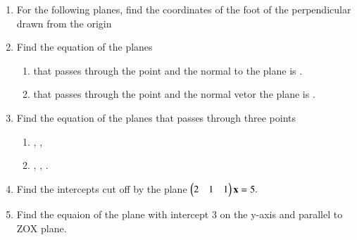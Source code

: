 \begin{enumerate}[label=\arabic*.,ref=\thesubsection.\theenumi]
%
\item  For the following planes, find the coordinates of the foot of the perpendicular drawn from the origin
\begin{enumerate}[itemsep=2pt]
\end{enumerate}
\item Find the equation of the planes
\begin{enumerate}
\item that passes through the point  and the normal to the plane is .
\item that passes through the point  and the normal vetor the plane is .
\end{enumerate}
\item Find the equation of the planes that passes through three points
\begin{enumerate}
\item {}, , 
\item {}, , .
\end{enumerate}
\item Find the intercepts cut off by the plane 
$
\begin{pmatrix}2 & 1 & 1\end{pmatrix}\mathbf{x}=5.
$
\item Find the equaion of the plane with intercept 3 on the y-axis and parallel to ZOX plane.

\end{enumerate}
